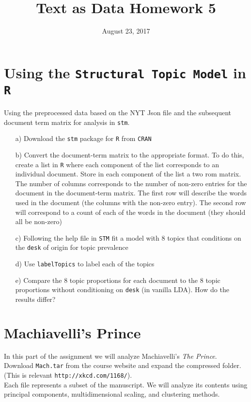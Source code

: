 \documentclass[letterpaper,12pt]{article}
\title{Text as Data Homework 5}
\date{August 23, 2017}
\numberwithin{equation}{section}
\numberwithin{equation}{section}
\begin{document}
\maketitle


\section{Using the {\tt Structural Topic Model} in {\tt R}}
Using the preprocessed data based on the NYT Json file and the subsequent document term matrix for analysis in {\tt stm}.


\begin{itemize}
\item[a)] Download the {\tt stm} package for {\tt R} from {\tt CRAN}
\item[b)] Convert the document-term matrix to the appropriate format.  To do this, create a list in {\tt R} where each component of the list corresponds to an individual document.  Store in each component of the list a two rom matrix.  The number of columns corresponds to the number of non-zero entries for the document in the document-term matrix.  The first row will describe the words used in the document (the columns with the non-zero entry).  The second row will correspond to a count of each of the words in the document (they should all be non-zero)
\item[c)] Following the help file in {\tt STM} fit a model with 8 topics that conditions on the {\tt desk} of origin for topic prevalence
\item[d)] Use {\tt labelTopics} to label each of the topics
\item[e)] Compare the 8 topic proportions for each document to the 8 topic proportions without conditioning on {\tt desk} (in vanilla LDA).  How do the results differ?
\end{itemize}



\section{Machiavelli's Prince}


In this part of the assignment we will analyze Machiavelli's \emph{The Prince}.  Download {\tt Mach.tar} from the course website and expand the compressed folder.  (This is relevant {\tt http://xkcd.com/1168/}).  \\

Each file represents a subset of the manuscript.  We will analyze its contents using principal components, multidimensional scaling, and clustering methods.
\end{document}
